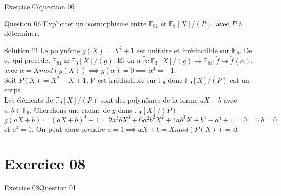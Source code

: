 \documentclass[10pt]{beamer}
\begin{document}
        \begin{frame}{Exercice 07}{question 06}
            \begin{alertblock}{Question 06}
                Expliciter un isomorphisme entre $\mathbb{F}_{81}$ et $\mathbb{F}_9[X]/(P)$, avec $P$ à déterminer.
            \end{alertblock}
            \begin{block}{Solution !!!}
                Le polynôme $g(X) = X^4 + 1$ est unitaire et irréductible sur $\mathbb{F}_9$. De ce qui précède, $\mathbb{F}_{81}  \backsimeq \mathbb{F}_3[X]/(g)$.\pause
                Et on a $ \tilde{\phi} : \mathbb{F}_3[X]/(g) \to \mathbb{F}_{81}; \tilde{f} \mapsto \tilde{f}(\alpha)$. \pause \\
                avec $\alpha = X mod(g(X)) \implies g(\alpha) = 0 \implies  \alpha^4 = -1$. \\ \pause 
                Soit $P(X) = X^2 + X + 1$, P est irréductible sur $\mathbb{F}_9$ donc $\mathbb{F}_9[X]/(P)$ est un corps. \\ \pause
                Les éléments de $\mathbb{F}_9[X]/(P)$ sont des polynômes de la forme $aX + b$ avec $a,b \in \mathbb{F}_9$. Cherchons une racine de $g$ dans $\mathbb{F}_9[X]/(P)$ \pause \\
                $g(aX + b) = (aX+b)^4 + 1 =  2a^3bX^3 + 6a^2b^2X^2 + 4ab^3X + b^4 - a^4 + 1 = 0 \implies b = 0$ et $ a^4 = 1$. On peut alors prendre $a=1 \implies aX+b = X mod(P(X)) = \beta$.
            \end{block}
        \end{frame}
    \section{Exercice 08}
        \begin{frame}{Exercice 08}{Question 01}
            
        \end{frame}
\end{document}
